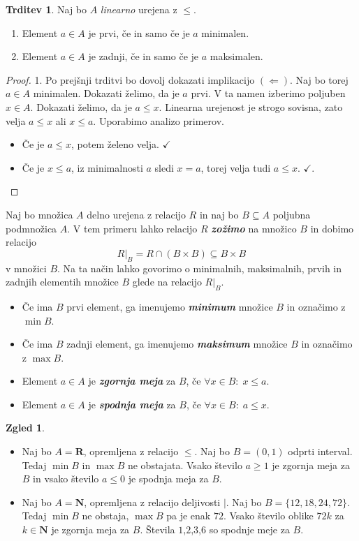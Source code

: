 \documentclass[11pt]{book}
\def\NN{\mathbf{N}}
\def\RR{\mathbf{R}}
\def\definicija{\color{rdeca}\bf\em}
\def\kljuka{$\checkmark$}
\theoremstyle{definition}
\theoremstyle{zgled}
\newtheorem*{zgled}{Zgled}
\theoremstyle{odprtproblem}
\theoremstyle{domacanaloga}
\newenvironment{dokaz}
    {\color{siva}\begin{proof}}
    {\end{proof}}
\theoremstyle{izrek}
\newtheorem*{trditev}{Trditev}
\begin{document}
\begin{trditev}
Naj bo $A$ \emph{linearno} urejena z $\leq$.
\begin{enumerate}
    \item Element $a \in A$ je prvi, če in samo če je $a$ minimalen.
    \item Element $a \in A$ je zadnji, če in samo če je $a$ maksimalen.
\end{enumerate}
\end{trditev}
\begin{dokaz}
1. Po prejšnji trditvi bo dovolj dokazati implikacijo $(\Leftarrow)$. Naj bo torej $a \in A$ minimalen. Dokazati želimo, da je $a$ prvi. V ta namen izberimo poljuben $x \in A$. Dokazati želimo, da je $a \leq x$. Linearna urejenost je strogo sovisna, zato velja $a \leq x$ ali $x \leq a$. Uporabimo analizo primerov. 
\begin{itemize}
    \item Če je $a \leq x$, potem želeno velja. \kljuka 
    \item Če je $x \leq a$, iz minimalnosti $a$ sledi $x = a$, torej velja tudi $a \leq x$. \kljuka.
\end{itemize}
\end{dokaz}

Naj bo množica $A$ delno urejena z relacijo $R$ in naj bo $B \subseteq A$ poljubna podmnožica $A$. V tem primeru lahko relacijo $R$ {\definicija zožimo} na množico $B$ in dobimo relacijo
\[
    R |_B = R \cap (B \times B) \subseteq B \times B
\]
v množici $B$. Na ta način lahko govorimo o minimalnih, maksimalnih, prvih in zadnjih elementih množice $B$ glede na relacijo $R|_B$.
\begin{itemize}
    \item Če ima $B$ prvi element, ga imenujemo {\definicija minimum} množice $B$ in označimo z $\min B$.
    \item Če ima $B$ zadnji element, ga imenujemo {\definicija maksimum} množice $B$ in označimo z $\max B$.
    \item Element $a \in A$ je {\definicija zgornja meja} za $B$, če $\forall x \in B \colon \; x \leq a$.
    \item Element $a \in A$ je {\definicija spodnja meja} za $B$, če $\forall x \in B \colon \; a \leq x$.
\end{itemize}

\begin{zgled} \leavevmode
\begin{itemize}
    \item Naj bo $A = \RR$, opremljena z relacijo $\leq$. Naj bo $B = (0,1)$ odprti interval. Tedaj $\min B$ in $\max B$ ne obstajata. Vsako število $a \geq 1$ je zgornja meja za $B$ in vsako število $a \leq 0$ je spodnja meja za $B$.
    \item Naj bo $A = \NN$, opremljena z relacijo deljivosti $|$. Naj bo $B = \{ 12, 18, 24, 72 \}$. Tedaj $\min B$ ne obstaja, $\max B$ pa je enak $72$. Vsako število oblike $72k$ za $k \in \NN$ je zgornja meja za $B$. Števila $1$,$2$,$3$,$6$ so spodnje meje za $B$.
\end{itemize}
\end{zgled}
\end{document}
